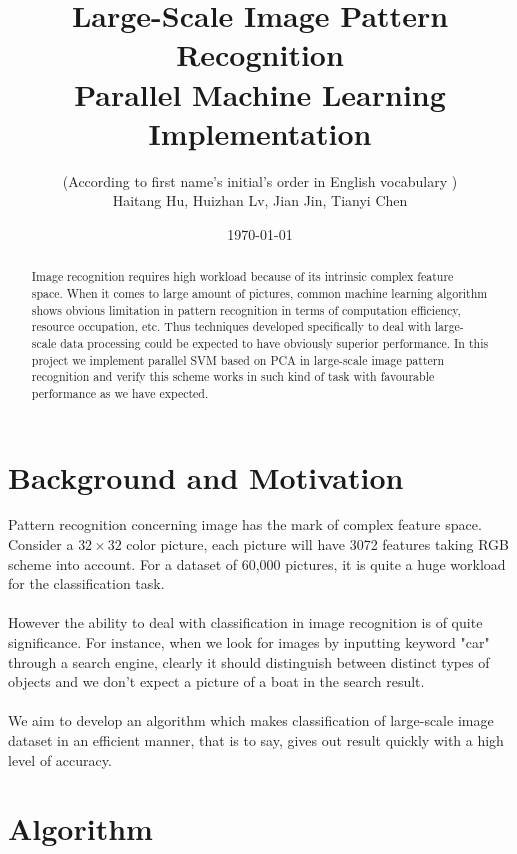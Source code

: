 \documentclass[a4paper]{article}
\title{Large-Scale Image Pattern Recognition\\
Parallel Machine Learning Implementation}
\author{(According to first name's initial's order in English vocabulary )\\
Haitang Hu, Huizhan Lv, Jian Jin, Tianyi Chen}
\date{\today}
\begin{document}
\maketitle

\begin{abstract}
Image recognition requires high workload because of its intrinsic complex feature space. When it comes to large amount of pictures, common machine learning algorithm shows obvious limitation in pattern recognition in terms of computation efficiency, resource occupation, etc. Thus techniques developed specifically to deal with large-scale data processing could be expected to have obviously superior performance. In this project we implement parallel SVM based on PCA in large-scale image pattern recognition and verify this scheme works in such kind of task with favourable performance as we have expected. 
\end{abstract}

\section{Background and Motivation}
Pattern recognition concerning image has the mark of complex feature space. Consider a $32\times 32$ color picture, each picture will have 3072 features taking RGB scheme into account. For a dataset of 60,000 pictures, it is quite a huge workload for the classification task.\\
\\
However the ability to deal with classification in image recognition is of quite significance. For instance, when we  look for images by inputting keyword "car" through a search engine, clearly it should distinguish between distinct types of objects and we don't expect a picture of a boat in the search result.\\
\\
We aim to develop an algorithm which makes classification of large-scale image dataset in an efficient manner, that is to say, gives out result quickly with a high level of accuracy. 
\section{Algorithm}
\end{document}
